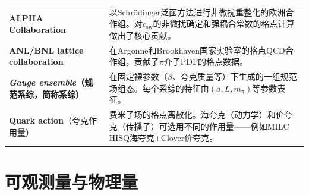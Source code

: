 \documentclass[12pt,a4paper]{ctexart}
\begin{document}
\begin{longtable}{p{3.5cm}p{9cm}}
\textbf{ALPHA Collaboration}& 以Schr\"odinger泛函方法进行非微扰重整化的欧洲合作组。对$c_{\text{sw}}$的非微扰确定和强耦合常数的格点计算做出了核心贡献。\\
\textbf{ANL/BNL lattice collaboration}& 在Argonne和Brookhaven国家实验室的格点QCD合作组，贡献了$\pi$介子PDF的格点数据。\\
\textbf{\textit{Gauge ensemble}（规范系综，简称系综）}& 在固定裸参数（$\beta$、夸克质量等）下生成的一组规范场组态。每个系综的特征由$(a, L, m_\pi)$等参数表征。\\
\textbf{Quark action}（夸克作用量）& 费米子场的格点离散化。海夸克（动力学）和价夸克（传播子）可选用不同的作用量——例如MILC HISQ海夸克+Clover价夸克。\\
\bottomrule
\end{longtable}

\section{可观测量与物理量}
\end{document}
